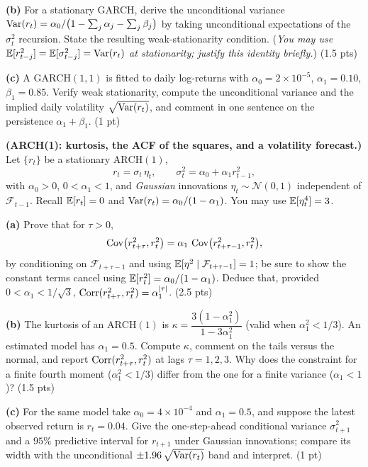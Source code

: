 \documentclass[11pt]{article}
\newcommand{\F}{\mathcal{F}}
\begin{document}
\textbf{(b)} For a stationary GARCH, derive the unconditional variance
$\operatorname{Var}(r_t)=\alpha_0/\bigl(1-\sum_{j}\alpha_j-\sum_{j}\beta_j\bigr)$ by taking unconditional expectations of the $\sigma_t^2$ recursion. State the resulting weak-stationarity condition. (\emph{You may use $\mathbb{E}[r_{t-j}^2]=\mathbb{E}[\sigma_{t-j}^2]=\operatorname{Var}(r_t)$ at stationarity; justify this identity briefly.}) \hfill(1.5 pts)

\textbf{(c)} A $\mathrm{GARCH}(1,1)$ is fitted to daily log-returns with $\alpha_0=2\times10^{-5}$, $\alpha_1=0.10$, $\beta_1=0.85$. Verify weak stationarity, compute the unconditional variance and the implied daily volatility $\sqrt{\operatorname{Var}(r_t)}$, and comment in one sentence on the persistence $\alpha_1+\beta_1$. \hfill(1 pt)
\answerpage

\textbf{(ARCH(1): kurtosis, the ACF of the squares, and a volatility forecast.)} Let $\{r_t\}$ be a stationary $\mathrm{ARCH}(1)$,
\[
r_t=\sigma_t\,\eta_t ,\qquad \sigma_t^2=\alpha_0+\alpha_1 r_{t-1}^2 ,
\]
with $\alpha_0>0$, $0<\alpha_1<1$, and \emph{Gaussian} innovations $\eta_t\sim\mathcal N(0,1)$ independent of $\F_{t-1}$. Recall $\mathbb{E}[r_t]=0$ and $\operatorname{Var}(r_t)=\alpha_0/(1-\alpha_1)$. You may use $\mathbb{E}[\eta_t^4]=3$.

\textbf{(a)} Prove that for $\tau>0$,
\[
\operatorname{Cov}\bigl(r_{t+\tau}^2,r_t^2\bigr)=\alpha_1\,\operatorname{Cov}\bigl(r_{t+\tau-1}^2,r_t^2\bigr),
\]
by conditioning on $\F_{t+\tau-1}$ and using $\E[\eta^2\mid\F_{t+\tau-1}]=1$; be sure to show the constant terms cancel using $\mathbb{E}[r_t^2]=\alpha_0/(1-\alpha_1)$. Deduce that, provided $0<\alpha_1<1/\sqrt3$, $\operatorname{Corr}(r_{t+\tau}^2,r_t^2)=\alpha_1^{\left\lvert \tau \right\rvert}$. \hfill(2.5 pts)

\textbf{(b)} The kurtosis of an $\mathrm{ARCH}(1)$ is $\kappa=\dfrac{3(1-\alpha_1^2)}{1-3\alpha_1^2}$ (valid when $\alpha_1^2<1/3$). An estimated model has $\alpha_1=0.5$. Compute $\kappa$, comment on the tails versus the normal, and report $\operatorname{Corr}(r_{t+\tau}^2,r_t^2)$ at lags $\tau=1,2,3$. Why does the constraint for a finite fourth moment ($\alpha_1^2<1/3$) differ from the one for a finite variance ($\alpha_1<1$)? \hfill(1.5 pts)

\textbf{(c)} For the same model take $\alpha_0=4\times10^{-4}$ and $\alpha_1=0.5$, and suppose the latest observed return is $r_t=0.04$. Give the one-step-ahead conditional variance $\sigma_{t+1}^2$ and a $95\%$ predictive interval for $r_{t+1}$ under Gaussian innovations; compare its width with the unconditional $\pm1.96\,\sqrt{\operatorname{Var}(r_t)}$ band and interpret. \hfill(1 pt)
\answerpage
\end{document}
